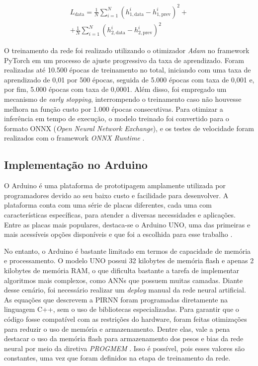 \begin{equation}
  \begin{split}
    L_{\mathrm{data}} = \frac{1}{N} \sum_{i = 1}^{N}
    \left( h_{1, \mathrm{data}}^{i} - h_{1, \mathrm{prev}}^{i} \right)^{2} + \\
    + \frac{1}{N} \sum_{i = 1}^{N}
    \left( h_{2, \mathrm{data}}^{i} - h_{2, \mathrm{prev}}^{i} \right)^{2}
    \label{eq:loss-data}
  \end{split}
\end{equation}

O treinamento da rede foi realizado utilizando o otimizador \textit{Adam} no framework PyTorch \citep{kingma_2017, pytorch_2024} em um processo de ajuste progressivo da taxa de aprendizado. Foram realizadas até 10.500 épocas de treinamento no total, iniciando com uma taxa de aprendizado de 0,01 por 500 épocas, seguida de 5.000 épocas com taxa de 0,001 e, por fim, 5.000 épocas com taxa de 0,0001. Além disso, foi empregado um mecanismo de \textit{early stopping}, interrompendo o treinamento caso não houvesse melhora na função custo por 1.000 épocas consecutivas. Para otimizar a inferência em tempo de execução, o modelo treinado foi convertido para o formato ONNX (\textit{Open Neural Network Exchange}), e os testes de velocidade foram realizados com o framework \textit{ONNX Runtime} \citep{onnxruntime}.

\subsection{Implementação no Arduino}

O Arduino é uma plataforma de prototipagem amplamente utilizada por programadores devido ao seu baixo custo e facilidade para desenvolver. A plataforma conta com uma série de placas diferentes, cada uma com características específicas, para atender a diversas necessidades e aplicações. Entre as placas mais populares, destaca-se o Arduino UNO, uma das primeiras e mais acessíveis opções disponíveis e que foi a escolhida para esse trabalho \citep{hughes_2016}.

No entanto, o Arduino é bastante limitado em termos de capacidade de memória e processamento. O modelo UNO possui 32 kilobytes de memória flash e apenas 2 kilobytes de memória RAM, o que dificulta bastante a tarefa de implementar algoritmos mais complexos, como ANNs que possuem muitas camadas. Diante desse cenário, foi necessário realizar um \textit{deploy} manual da rede neural artificial. As equações que descrevem a PIRNN foram programadas diretamente na linguagem C++, sem o uso de bibliotecas especializadas. Para garantir que o código fosse compatível com as restrições do hardware, foram feitas otimizações para reduzir o uso de memória e armazenamento. Dentre elas, vale a pena destacar o uso da memória flash para armazenamento dos pesos e bias da rede neural por meio da diretiva \textit{PROGMEM} \citep{margolis_2020}. Isso é possível, pois esses valores são constantes, uma vez que foram definidos na etapa de treinamento da rede.


